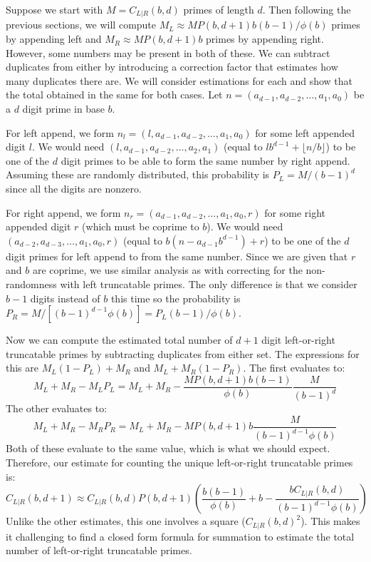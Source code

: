 \documentclass[12pt]{article}
\begin{document}
Suppose we start with $M=C_{L|R}(b,d)$ primes of length $d$. Then following the previous sections, we will compute $M_L \approx MP(b,d+1)b(b-1)/\phi(b)$ primes by appending left and $M_R \approx MP(b,d+1)b$ primes by appending right. However, some numbers may be present in both of these. We can subtract duplicates from either by introducing a correction factor that estimates how many duplicates there are. We will consider estimations for each and show that the total obtained in the same for both cases. Let $n=(a_{d-1},a_{d-2},\dots,a_1,a_0)$ be a $d$ digit prime in base $b$.

For left append, we form $n_l=(l,a_{d-1},a_{d-2},\ldots,a_1,a_0)$ for some left appended digit $l$. We would need $(l,a_{d-1},a_{d-2},\ldots,a_2,a_1)$ (equal to $lb^{d-1}+\lfloor n/b\rfloor$) to be one of the $d$ digit primes to be able to form the same number by right append. Assuming these are randomly distributed, this probability is $P_L=M/(b-1)^d$ since all the digits are nonzero.

For right append, we form $n_r=(a_{d-1},a_{d-2},\ldots,a_1,a_0,r)$ for some right appended digit $r$ (which must be coprime to $b$). We would need $(a_{d-2},a_{d-3},\ldots,a_1,a_0,r)$ (equal to $b(n-a_{d-1}b^{d-1})+r$) to be one of the $d$ digit primes for left append to from the same number. Since we are given that $r$ and $b$ are coprime, we use similar analysis as with correcting for the non-randomness with left truncatable primes. The only difference is that we consider $b-1$ digits instead of $b$ this time so the probability is $P_R=M/[(b-1)^{d-1}\phi(b)]=P_L(b-1)/\phi(b)$.

Now we can compute the estimated total number of $d+1$ digit left-or-right truncatable primes by subtracting duplicates from either set. The expressions for this are $M_L(1-P_L)+M_R$ and $M_L+M_R(1-P_R)$. The first evaluates to:
\begin{equation}
M_L + M_R - M_LP_L = M_L + M_R - \frac{MP(b,d+1)b(b-1)}{\phi(b)} \frac{M}{(b-1)^d}
\end{equation}
The other evaluates to:
\begin{equation}
M_L + M_R - M_RP_R = M_L + M_R - MP(b,d+1)b \frac{M}{(b-1)^{d-1}\phi(b)}
\end{equation}
Both of these evaluate to the same value, which is what we should expect. Therefore, our estimate for counting the unique left-or-right truncatable primes is:
\begin{equation}
C_{L|R}(b,d+1) \approx C_{L|R}(b,d)P(b,d+1) \left( \frac{b(b-1)}{\phi(b)} + b - \frac{bC_{L|R}(b,d)}{(b-1)^{d-1}\phi(b)} \right)
\end{equation}
Unlike the other estimates, this one involves a square ($C_{L|R}(b,d)^2$). This makes it challenging to find a closed form formula for summation to estimate the total number of left-or-right truncatable primes.
\end{document}
